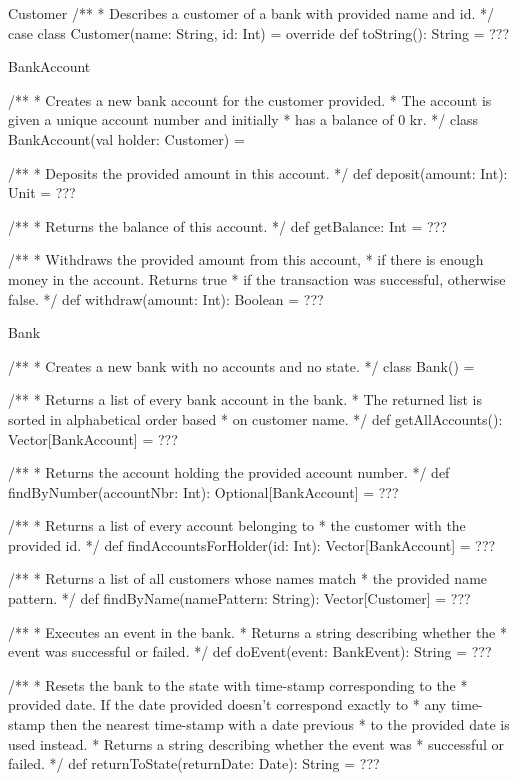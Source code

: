 \begin{ScalaSpec}{Customer}
/**
 * Describes a customer of a bank with provided name and id.
 */
case class Customer(name: String, id: Int) = {
	override def toString(): String = ???
}

\end{ScalaSpec}


\begin{ScalaSpec}{BankAccount}

/**
 * Creates a new bank account for the customer provided.
 * The account is given a unique account number and initially
 * has a balance of 0 kr.
 */
class BankAccount(val holder: Customer) = {

  /**
   * Deposits the provided amount in this account.
   */
  def deposit(amount: Int): Unit = ???

  /**
   * Returns the balance of this account.
   */
  def getBalance: Int = ???

  /**
   * Withdraws the provided amount from this account,
   * if there is enough money in the account. Returns true
   * if the transaction was successful, otherwise false.
   */
  def withdraw(amount: Int): Boolean = ???

}
\end{ScalaSpec}


\begin{ScalaSpec}{Bank}

/**
 * Creates a new bank with no accounts and no state.
 */
class Bank() = {

 /**
   * Returns a list of every bank account in the bank.
   * The returned list is sorted in alphabetical order based
   * on customer name.
   */
  def getAllAccounts(): Vector[BankAccount] = ???

  /**
   * Returns the account holding the provided account number.
   */
  def findByNumber(accountNbr: Int): Optional[BankAccount] = ???

  /**
   * Returns a list of every account belonging to
   * the customer with the provided id.
   */
  def findAccountsForHolder(id: Int): Vector[BankAccount] = ???

  /**
   * Returns a list of all customers whose names match
   * the provided name pattern.
   */
  def findByName(namePattern: String): Vector[Customer] = ???

 /**
   * Executes an event in the bank.
   * Returns a string describing whether the
   * event was successful or failed.
   */
  def doEvent(event: BankEvent): String = ???

  /**
   * Resets the bank to the state with time-stamp corresponding to the
   * provided date. If the date provided doesn't correspond exactly to
   * any time-stamp then the nearest time-stamp with a date previous
   * to the provided date is used instead.
   * Returns a string describing whether the event was
   * successful or failed.
   */
  def returnToState(returnDate: Date): String = ???

}
\end{ScalaSpec}


